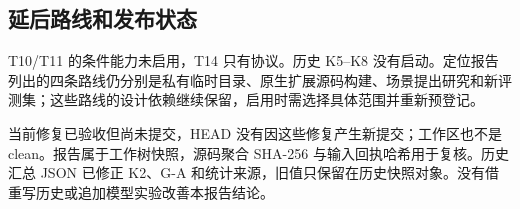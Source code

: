 \subsection{延后路线和发布状态}
T10/T11 的条件能力未启用，T14 只有协议。历史 K5--K8 没有启动。定位报告列出的四条路线仍分别是私有临时目录、原生扩展源码构建、场景提出研究和新评测集；这些路线的设计依赖继续保留，启用时需选择具体范围并重新预登记。\citep{positioning,architectureplan}

当前修复已验收但尚未提交，HEAD 没有因这些修复产生新提交；工作区也不是 clean。报告属于工作树快照，源码聚合 SHA-256 与输入回执哈希用于复核。历史汇总 JSON 已修正 K2、G-A 和统计来源，旧值只保留在历史快照对象。没有借重写历史或追加模型实验改善本报告结论。
